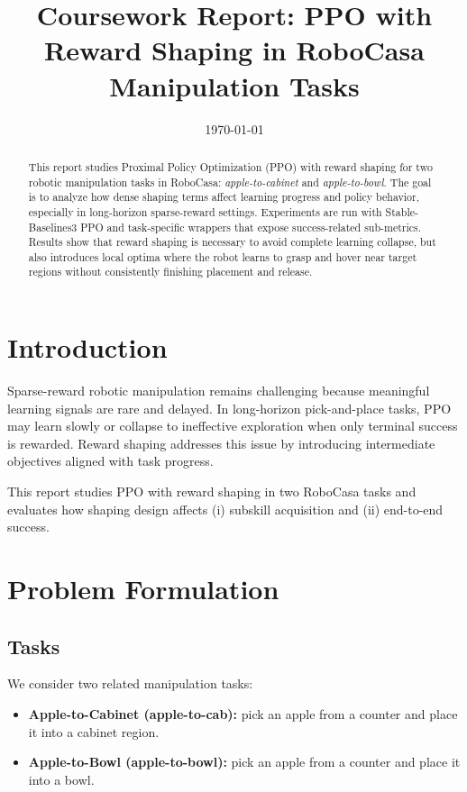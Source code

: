 \documentclass[11pt,a4paper]{article}
\title{Coursework Report: PPO with Reward Shaping in RoboCasa Manipulation Tasks}
\author{}
\date{\today}
\begin{document}
\maketitle

\begin{abstract}
This report studies Proximal Policy Optimization (PPO) with reward shaping for two robotic manipulation tasks in RoboCasa: \textit{apple-to-cabinet} and \textit{apple-to-bowl}. The goal is to analyze how dense shaping terms affect learning progress and policy behavior, especially in long-horizon sparse-reward settings. Experiments are run with Stable-Baselines3 PPO and task-specific wrappers that expose success-related sub-metrics. Results show that reward shaping is necessary to avoid complete learning collapse, but also introduces local optima where the robot learns to grasp and hover near target regions without consistently finishing placement and release.
\end{abstract}

\section{Introduction}
Sparse-reward robotic manipulation remains challenging because meaningful learning signals are rare and delayed. In long-horizon pick-and-place tasks, PPO may learn slowly or collapse to ineffective exploration when only terminal success is rewarded. Reward shaping addresses this issue by introducing intermediate objectives aligned with task progress.

This report studies PPO with reward shaping in two RoboCasa tasks and evaluates how shaping design affects (i) subskill acquisition and (ii) end-to-end success.

\section{Problem Formulation}
\subsection{Tasks}
We consider two related manipulation tasks:
\begin{itemize}
    \item \textbf{Apple-to-Cabinet (apple-to-cab):} pick an apple from a counter and place it into a cabinet region.
    \item \textbf{Apple-to-Bowl (apple-to-bowl):} pick an apple from a counter and place it into a bowl.
\end{itemize}
\end{document}
